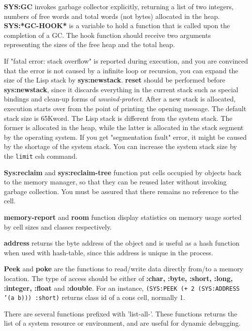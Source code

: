 {\bf SYS:GC} invokes garbage collector explicitly, returning a list of two integers,
numbers of free words and total words (not bytes) allocated in the heap.
{\bf SYS:*GC-HOOK*} is a variable to hold a function that is called upon the
completion of a GC.  The hook function should receive two arguments
representing the sizes of the free heap and the total heap.

If "fatal error: stack overflow" is reported during  execution,
and you are convinced that the error is not caused by a infinite loop
or recursion, 
you can expand the size of the Lisp stack by {\bf sys:newstack}.
{\bf reset} should be performed before {\bf sys:newstack},
since it discards everything in the current stack such as
special bindings and clean-up forms of {\em unwind-protect}.
After a new stack is allocated, execution starts over from the point
of printing the opening message.
The default stack size is 65Kword.
The Lisp stack is different from the system stack.
The former is allocated in the heap, while the latter is allocated in
the stack segment by the operating system.
If you get "segmentation fault" error, it might be caused by the shortage
of the system stack.
You can increase the system stack size by the {\tt limit} csh command.

{\bf Sys:reclaim} and {\bf sys:reclaim-tree} function put cells occupied by objects
back to the memory manager, so that they can be reused later without
invoking garbage collection.
You must be assured that there remains no reference to the cell.

{\bf memory-report} and {\bf room} function display statistics on 
memory usage sorted by cell sizes and classes respectively.

{\bf address} returns the byte address of the object and is useful
as a hash function when used with hash-table, since this address is
unique in the process.

{\bf Peek} and {\bf poke} are the functions to read/write data directly
from/to a memory location.
The type of access should be either of
{\bf :char, :byte, :short, :long, :integer, :float} and {\bf :double}.
For an instance, {\tt (SYS:PEEK (+ 2 (SYS:ADDRESS '(a b))) :short)}
returns class id of a cons cell, normally 1.

There are  several functions prefixed with 'list-all-'.
These functions returns the list of a system resource or environment,
and are useful for dynamic debugging.

